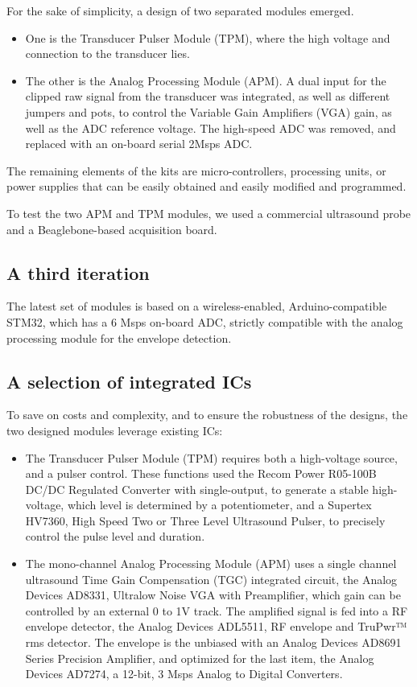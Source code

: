 \documentclass[letterpaper, 10 pt, conference]{ieeeconf} %
\begin{document}
For the sake of simplicity, a design of two separated modules emerged.

\begin{itemize} 
\item One is the Transducer Pulser Module (TPM), where the high voltage and connection to the transducer lies.
\item The other is the Analog Processing Module (APM). A dual input for the clipped raw signal from the transducer was integrated, as well as different jumpers and pots, to control the Variable Gain Amplifiers (VGA) gain, as well as the ADC reference voltage. The high-speed ADC was removed, and replaced with an on-board serial 2Msps ADC.
\end{itemize}

The remaining elements of the kits are micro-controllers, processing units, or power supplies that can be easily obtained and easily modified and programmed.

To test the two APM and TPM modules, we used a commercial ultrasound probe and a Beaglebone-based acquisition board.

\subsection{A third iteration}

The latest set of modules is based on a wireless-enabled, Arduino-compatible STM32, which has a 6 Msps on-board ADC, strictly compatible with the analog processing module for the envelope detection.

\subsection{A selection of integrated ICs}

To save on costs and complexity, and to ensure the robustness of the designs, the two designed modules leverage existing ICs:

\begin{itemize}
\item The Transducer Pulser Module (TPM) requires both a high-voltage source, and a pulser control. These functions used the Recom Power R05-100B DC/DC Regulated Converter with single-output, to generate a stable high-voltage, which level is determined by a potentiometer, and a Supertex HV7360, High Speed Two or Three Level Ultrasound Pulser, to precisely control the pulse level and duration.
\item The mono-channel Analog Processing Module (APM) uses a single channel ultrasound Time Gain Compensation (TGC) integrated circuit, the Analog Devices AD8331, Ultralow Noise VGA with Preamplifier, which gain can be controlled by an external 0 to 1V track. The amplified signal is fed into a RF envelope detector, the Analog Devices ADL5511, RF envelope and TruPwr™ rms detector. The envelope is the unbiased with an Analog Devices AD8691 Series Precision Amplifier, and optimized for the last item, the  Analog Devices AD7274, a 12-bit, 3 Msps Analog to Digital Converters.
\end{itemize}
\end{document}
